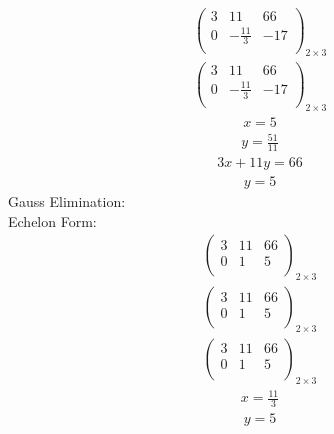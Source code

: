 \documentclass{article}
\begin{document}
\begin{align*}
\left(
\begin{array}{cc|c}
3 & 11 & 66\\
0 & -\frac{11}{3} & -17\\
\end{array}
\right)_{2\times 3}
\end{align*}
\begin{align*}
\left(
\begin{array}{cc|c}
3 & 11 & 66\\
0 & -\frac{11}{3} & -17\\
\end{array}
\right)_{2\times 3}
\end{align*}
\begin{align*}
x=5\end{align*}
\begin{align*}
y=\frac{51}{11}\end{align*}
\begin{align*}
3x + 11y=66\end{align*}
\begin{align*}
y=5\end{align*}
Gauss Elimination:\\
Echelon Form:\\
\begin{align*}
\left(
\begin{array}{cc|c}
3 & 11 & 66\\
0 & 1 & 5\\
\end{array}
\right)_{2\times 3}
\end{align*}
\begin{align*}
\left(
\begin{array}{cc|c}
3 & 11 & 66\\
0 & 1 & 5\\
\end{array}
\right)_{2\times 3}
\end{align*}
\begin{align*}
\left(
\begin{array}{cc|c}
3 & 11 & 66\\
0 & 1 & 5\\
\end{array}
\right)_{2\times 3}
\end{align*}
\begin{align*}
x=\frac{11}{3}\end{align*}
\begin{align*}
y=5\end{align*}
\end{document}
